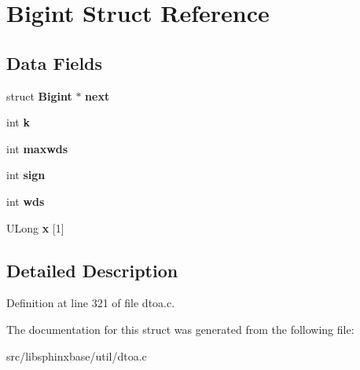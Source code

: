 \section{Bigint Struct Reference}
\label{structBigint}
\subsection*{Data Fields}
\begin{DoxyCompactItemize}
\item 
struct {\bf Bigint} $\ast$ {\bfseries next}\label{structBigint_a3a1296e26ef617e775d5e366e390e7fc}

\item 
int {\bfseries k}\label{structBigint_a032d76e80da2f21df10c0794244d12f2}

\item 
int {\bfseries maxwds}\label{structBigint_a5ffcac6f95ded3bc1fc23204f46f10d0}

\item 
int {\bfseries sign}\label{structBigint_a4380eb98f7653bb74d8377c0d68d6cb7}

\item 
int {\bfseries wds}\label{structBigint_aa737992ebddb9d6a7e2d23bfecdb080e}

\item 
U\-Long {\bfseries x} [1]\label{structBigint_ae56981315f471a190603887aee98ca99}

\end{DoxyCompactItemize}


\subsection{Detailed Description}


Definition at line 321 of file dtoa.\-c.



The documentation for this struct was generated from the following file\-:\begin{DoxyCompactItemize}
\item 
src/libsphinxbase/util/dtoa.\-c\end{DoxyCompactItemize}
